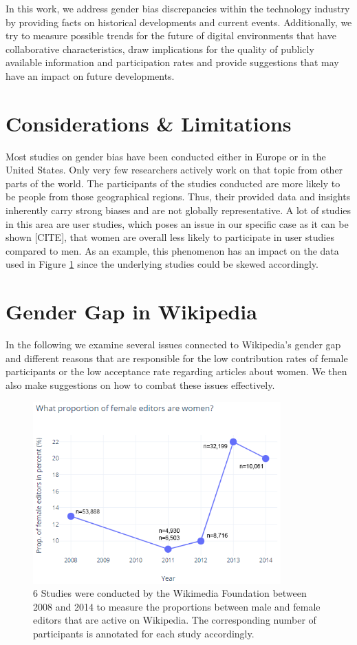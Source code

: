 \documentclass[a4paper, 11pt]{article}
\begin{document}
In this work, we address gender bias discrepancies within the technology industry by providing facts on historical developments and current events. Additionally, we try to measure possible trends for the future of digital environments that have collaborative characteristics, draw implications for the quality of publicly available information and participation rates and provide suggestions that may have an impact on future developments.

\section{Considerations \& Limitations} \label{sec:considerations}
Most studies on gender bias have been conducted either in Europe or in the United States. Only very few researchers actively work on that topic from other parts of the world. The participants of the studies conducted are more likely to be people from those geographical regions. Thus, their provided data and insights inherently carry strong biases and are not globally representative. A lot of studies in this area are user studies, which poses an issue in our specific case as it can be shown [CITE], that women are overall less likely to participate in user studies compared to men. As an example, this phenomenon has an impact on the data used in Figure \ref{fig:PropFemaleEditors} since the underlying studies could be skewed accordingly.

\section{Gender Gap in Wikipedia} \label{sec:gender-gap-wikipedia}
In the following we examine several issues connected to Wikipedia’s gender gap and different reasons that are responsible for the low contribution rates of female participants or the low acceptance rate regarding articles about women. We then also make suggestions on how to combat these issues effectively.

\begin{figure}[t]
	\centering
	\includegraphics[width=0.85\textwidth]{figures/PropFemaleEditors.png}
\caption{6 Studies were conducted by the Wikimedia Foundation between 2008 and 2014 to measure the proportions between male and female editors that are active on Wikipedia. The corresponding number of participants is annotated for each study accordingly.} \label{fig:PropFemaleEditors}
\end{figure}
\end{document}
